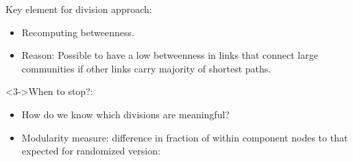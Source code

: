 



\begin{frame}

  \begin{block}{Key element for division approach:}
    \begin{itemize}
    \item<1-> 
      Recomputing betweenness.
    \item<2-> 
      \alert{Reason:} Possible to have a low betweenness
      in links that connect large communities
      if other links carry majority of shortest paths.
    \end{itemize}
  \end{block}

  \begin{block}<3->{When to stop?:}
    \begin{itemize}
    \item<4-> 
      How do we know which
      divisions are meaningful?
    \item<5-> 
      \alert{Modularity measure:}
      difference in fraction of within component
      nodes to that expected for randomized version:\\
      \smallskip
    \end{itemize}
  \end{block}

\end{frame}

